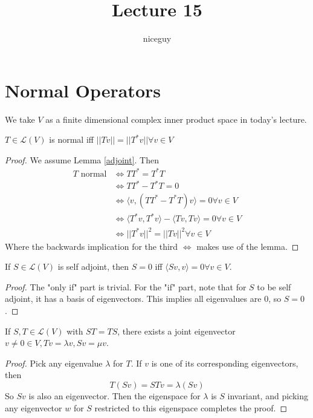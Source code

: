 \documentclass[12pt]{article}
\author{niceguy}
\title{Lecture 15}
\begin{document}
\maketitle

\section{Normal Operators}

We take $V$ as a finite dimensional complex inner product space in today's lecture.

\begin{prop}
	$T \in \mathcal L(V)$ is normal iff $||Tv|| = ||T^*v|| \forall v \in V$
\end{prop}

\begin{proof}
	We assume Lemma \ref{adjoint}. Then
	\begin{align*}
		T \text{ normal} &\Leftrightarrow TT^* = T^*T \\
				 &\Leftrightarrow TT^* - T^*T = 0 \\
				 &\Leftrightarrow \langle v, (TT^*-T^*T)v \rangle = 0 \forall v \in V \\
				 &\Leftrightarrow \langle T^*v,T^*v \rangle - \langle Tv,Tv \rangle = 0 \forall v \in V \\
				 &\Leftrightarrow ||T^*v||^2 = ||Tv||^2 \forall v \in V
	\end{align*}
	Where the backwards implication for the third $\Leftrightarrow$ makes use of the lemma.
\end{proof}

\begin{lem}\label{adjoint}
	If $S \in \mathcal L(V)$ is self adjoint, then $S=0$ iff $\langle Sv,v \rangle = 0 \forall v \in V$.
\end{lem}

\begin{proof}
	The "only if" part is trivial. For the "if" part, note that for $S$ to be self adjoint, it has a basis of eigenvectors. This implies all eigenvalues are 0, so $S=0$.
\end{proof}

\begin{lem}\label{joint}
	If $S,T \in \mathcal L(V)$ with $ST = TS$, there exists a joint eigenvector $v \neq 0 \in V, Tv = \lambda v, Sv = \mu v$.
\end{lem}

\begin{proof}
	Pick any eigenvalue $\lambda$ for $T$. If $v$ is one of its corresponding eigenvectors, then
	$$T(Sv) = STv = \lambda(Sv)$$
	So $Sv$ is also an eigenvector. Then the eigenspace for $\lambda$ is $S$ invariant, and picking any eigenvector $w$ for $S$ restricted to this eigenspace completes the proof.
\end{proof}
\end{document}

